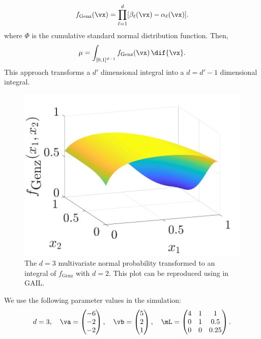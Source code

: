 \fi

\begin{align}
\label{eqn:fGenzdef}
f_{\text{Genz}}(\vx) = \prod_{\ell=1}^d [\beta_\ell(\vx) - \alpha_\ell(\vx)].
\end{align}
where $\Phi$ is the cumulative standard normal distribution function.
Then, $$\mu = \int_{[0,1]^{d-1}} f_{\text{Genz}}(\vx) \, \dif{\vx}.$$
This approach transforms a $d'$ dimensional integral into a $d=d'-1$ dimensional integral.

\begin{figure}
	\centering
		\includegraphics[width=0.75\linewidth]{BayesCub/figures/GenzFunc_varTx_none.png}
	\caption{The $d=3$ multivariate normal probability transformed to an integral of $f_{\text{Genz}}$ with  $d=2$. This plot can be reproduced using  in GAIL.}
	\label{fig:MVN_Genz}
\end{figure}

We use the following parameter values in the simulation: 
\begin{equation*}
d = 3, \quad \va = \begin{pmatrix}%
-6 \\ -2 \\ -2
\end{pmatrix}, \quad 
\vb = \begin{pmatrix}%
5 \\ 2 \\ 1
\end{pmatrix} , \quad 
\mL = \begin{pmatrix}%
4 & 1 & 1 \\ 0 & 1 & 0.5 \\ 0 & 0 & 0.25
\end{pmatrix}.
\end{equation*}



